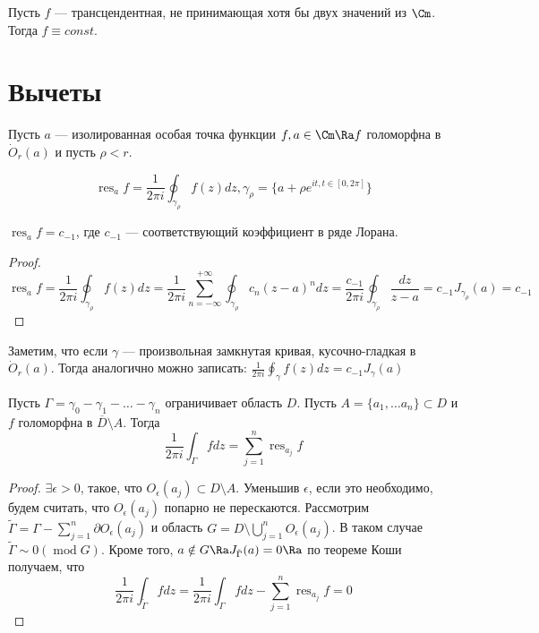 \begin{theorem}
    Пусть \(f\) --- трансцендентная, не принимающая хотя бы двух значений из \(\Cm\). Тогда \(f \equiv const\).
\end{theorem}

\section{Вычеты}

Пусть \(a\) --- изолированная особая точка функции \(f, a \in \Cm \Ra f\) голоморфна в \(\dot O_r(a)\) и пусть \(\rho < r\). 

\begin{definition}
    \[\operatorname{res}_a f = \frac{1}{2\pi i} \oint_{\gamma_\rho}f(z)dz, \gamma_\rho = \{a + \rho e^{it, t \in [0, 2\pi]}\}\]
\end{definition}

\begin{proposition}
    \(\operatorname{res}_a f = c_{-1}\), где \(c_{-1}\) --- соответствующий коэффициент в ряде Лорана.
\end{proposition}
\begin{proof}
    \[\operatorname{res}_a f = \frac{1}{2\pi i} \oint_{\gamma_\rho}f(z)dz = \frac{1}{2\pi i}\sum_{n = -\infty}^{+\infty} \oint_{\gamma_\rho}c_n(z - a)^ndz = \frac{c_{-1}}{2\pi i}\oint_{\gamma_\rho} \frac{dz}{z - a} = c_{-1}J_{\gamma_\rho}(a) = c_{-1}\]
\end{proof}

\begin{note}
    Заметим, что если \(\gamma\) --- произвольная замкнутая кривая, кусочно-гладкая в \(\dot O_r(a)\). Тогда аналогично можно записать: \(\frac{1}{2\pi i} \oint_{\gamma}f(z)dz = c_{-1}J_{\gamma}(a)\)
\end{note}

\begin{theorem}
    Пусть \(\Gamma = \gamma_0 - \gamma_1 - \dots - \gamma_n\) ограничивает область \(D\). Пусть \(A = \{a_1, \dots a_n\} \subset D\) и \(f\) голоморфна в \(\overline{D} \setminus A\). Тогда 
    \[\frac{1}{2\pi i} \int_{\Gamma} fdz = \sum_{j = 1}^n \operatorname{res}_{a_j} f\]
\end{theorem}
\begin{proof}
    \(\exists \epsilon > 0\), такое, что \(O_\epsilon(a_j) \subset D \setminus A\). Уменьшив \(\epsilon\), если это необходимо, будем считать, что \(O_\epsilon(a_j)\) попарно не перескаются. Рассмотрим \(\tilde\Gamma = \Gamma - \sum_{j = 1}^n \partial O_\epsilon(a_j)\) и область \(G = D \setminus \bigcup_{j = 1}^n O_\epsilon(a_j)\). В таком случае \(\tilde\Gamma \sim 0 (\operatorname{mod} G)\). Кроме того, \(a \notin G \Ra J_{\tilde\Gamma}(a) = 0 \Ra\) по теореме Коши получаем, что
    \[\frac{1}{2\pi i} \int_{\tilde\Gamma} fdz = \frac{1}{2\pi i} \int_{\Gamma} fdz - \sum_{j = 1}^n \operatorname{res}_{a_j} f = 0\]
\end{proof}

